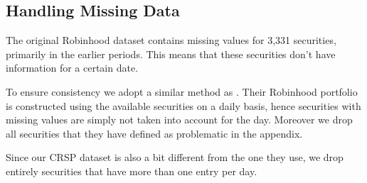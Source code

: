 \begin{appendices}
    



\clearpage
\section{Handling Missing Data}
\label{sec:data}
The original Robinhood dataset contains missing values for 3,331 securities, primarily in the earlier periods. 
This means that these securities don't have information for a certain date.
   
To ensure consistency we adopt a similar method as \cite{Fedyk2024}. Their Robinhood portfolio is constructed using the available securities on a daily basis, 
hence securities with missing values are simply not taken into account for the day. Moreover we drop all securities that they have defined as problematic in the appendix.

Since our CRSP dataset is also a bit different from the one they use, we drop entirely securities that have more than one entry per day.


\end{appendices}